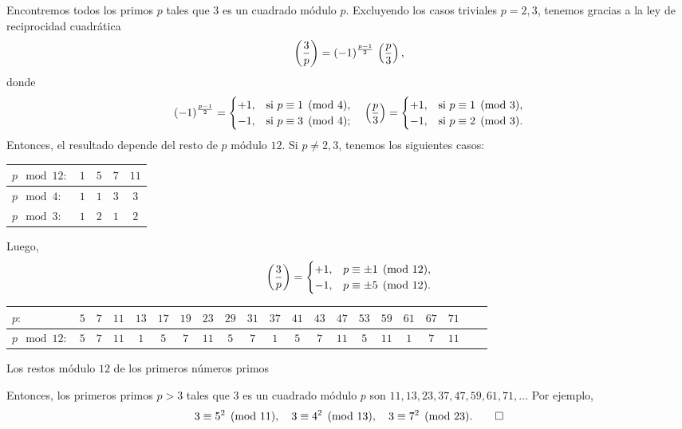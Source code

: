 \documentclass{article}
\theoremstyle{plain}
\begin{document}
\begin{ejemplo}
  Encontremos todos los primos $p$ tales que $3$ es un cuadrado módulo
  $p$. Excluyendo los casos triviales $p=2,3$, tenemos gracias a la ley de
  reciprocidad cuadrática
  $$\left(\frac{3}{p}\right) = (-1)^{\frac{p-1}{2}}\,\left(\frac{p}{3}\right),$$
  donde
  \[ (-1)^{\frac{p-1}{2}} = \begin{cases}
      +1, & \text{si }p\equiv 1 \pmod{4},\\
      -1, & \text{si }p\equiv 3 \pmod{4};
    \end{cases} \quad \left(\frac{p}{3}\right) = \begin{cases}
      +1, & \text{si }p \equiv 1 \pmod{3},\\
      -1, & \text{si }p \equiv 2 \pmod{3}.
    \end{cases} \]
  Entonces, el resultado depende del resto de $p$ módulo $12$. Si $p \ne 2,3$, tenemos los siguientes casos:
  \begin{center}
    \begin{tabular}{lcccc}
      \hline
      $p \mod 12\colon$ & $1$ & $5$ & $7$ & $11$ \\
      \hline
      $p \mod 4\colon$ & $1$ & $1$ & $3$ & $3$ \\
      \hline
      $p \mod 3\colon$ & $1$ & $2$ & $1$ & $2$ \\
      \hline
    \end{tabular}
  \end{center}

  Luego,
  \[ \left(\frac{3}{p}\right) = \begin{cases}
      +1, & p \equiv \pm 1 \pmod{12},\\
      -1, & p \equiv \pm 5 \pmod{12}.
    \end{cases} \]

  \begin{center}
    \begin{tabular}{lcccccccccccccccccccc}
      \hline
      $p\colon$ & $5$ & $7$ & $11$ & $13$ & $17$ & $19$ & $23$ & $29$ & $31$ & $37$ & $41$ & $43$ & $47$ & $53$ & $59$ & $61$ & $67$ & $71$ \\
      \hline
      $p \mod 12\colon$ & $5$ & $7$ & $11$ & $1$ & $5$ & $7$ & $11$ & $5$ & $7$ & $1$ & $5$ & $7$ & $11$ & $5$ & $11$ & $1$ & $7$ & $11$ \\
      \hline
    \end{tabular}

    \vspace{1em}

    Los restos módulo $12$ de los primeros números primos
  \end{center}

  Entonces, los primeros primos $p > 3$ tales que $3$ es un cuadrado módulo $p$
  son $11, 13, 23, 37, 47, 59, 61, 71, \ldots$ Por ejemplo,
  \[ 3 \equiv 5^2 \pmod{11}, \quad 3 \equiv 4^2 \pmod{13}, \quad
     3 \equiv 7^2 \pmod{23}. \qedhere \]
\end{ejemplo}
\end{document}
